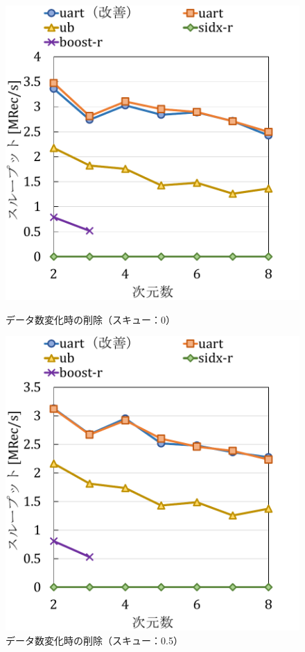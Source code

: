 \begin{figure}[tb]
  \begin{minipage}[c]{0.495\textwidth}
    \centering
    \includegraphics[scale=0.45]{./figures/graph-dimention-delete-0.pdf}
    \caption{データ数変化時の削除（スキュー：0）}
    \label{graph:grouped}
  \end{minipage}
  \begin{minipage}[c]{0.495\textwidth}
    \centering
    \includegraphics[scale=0.45]{./figures/graph-dimention-delete-0.5.pdf}
    \caption{データ数変化時の削除（スキュー：0.5）}
    \label{graph:paired}
  \end{minipage}
\end{figure}

